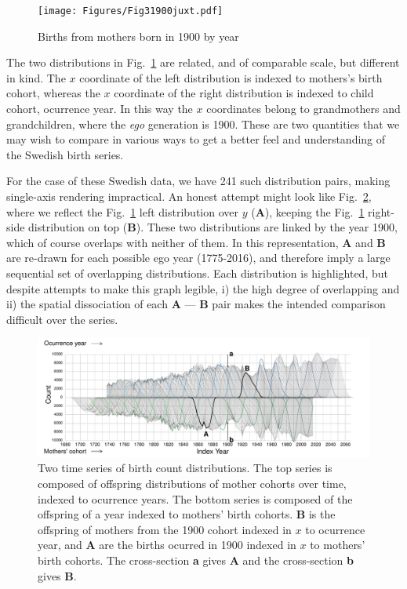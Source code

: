 \documentclass{article}
\begin{document}
\begin{figure}[ht!]
 \centering
        \texttt{[image: Figures/Fig31900juxt.pdf]}
        \caption{Births from mothers born in 1900 by year}
          \label{fig:juxt}
\end{figure}

The two distributions in Fig.~\ref{fig:juxt} are related, and of comparable scale, but different in kind. The $x$ coordinate of the left distribution is indexed to mothers's birth cohort, whereas the $x$ coordinate of the right distribution is indexed to child cohort, ocurrence year. In this way the $x$ coordinates belong to grandmothers and grandchildren, where the \emph{ego} generation is 1900. These are two quantities that we may wish to compare in various ways to get a better feel and understanding of the Swedish birth series. 

For the case of these Swedish data, we have 241 such distribution pairs, making single-axis rendering impractical. An honest attempt might look like Fig.~\ref{fig:reflect1}, where we reflect the Fig.~\ref{fig:juxt} left distribution over $y$ (\textbf{A}), keeping the Fig.~\ref{fig:juxt} right-side distribution on top (\textbf{B}). These two distributions are linked by the year 1900, which of course overlaps with neither of them. In this representation, \textbf{A} and \textbf{B} are re-drawn for each possible ego year (1775-2016), and therefore imply a large sequential set of overlapping distributions. Each  distribution is highlighted, but despite attempts to make this graph legible, i) the high degree of overlapping and ii) the spatial dissociation of each \textbf{A} --- \textbf{B} pair makes the intended comparison difficult over the series.

\begin{figure}[ht!]
 \centering
        \includegraphics[width=\textwidth]{Figures/FxFlowReflect.pdf}
        \caption{Two time series of birth count distributions. The top series is composed of offspring distributions of mother cohorts over time, indexed to ocurrence years. The bottom series is composed of the offspring of a year indexed to mothers' birth cohorts. \textbf{B} is the offspring of mothers from the 1900 cohort indexed in $x$ to ocurrence year, and \textbf{A} are the births ocurred in 1900 indexed in $x$ to mothers' birth cohorts. The cross-section \textbf{a} gives \textbf{A} and the cross-section \textbf{b} gives \textbf{B}.}
          \label{fig:reflect1}
\end{figure}
\end{document}

